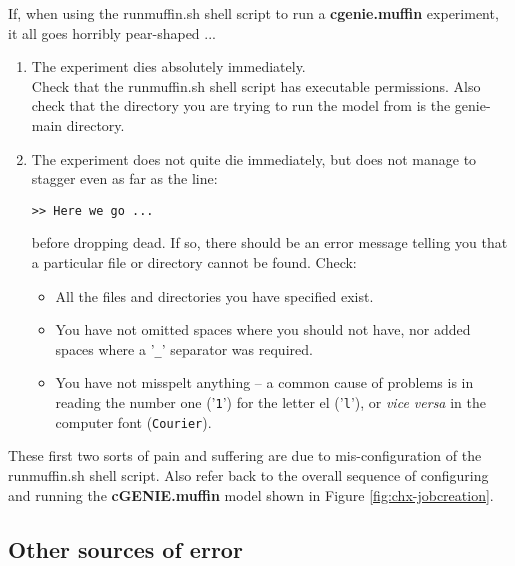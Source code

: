 \documentclass[11pt,fleqn]{book} %
\begin{document}
If, when using the \textsf{\footnotesize runmuffin.sh} shell script to run a \textbf{cgenie.muffin} experiment, it all goes horribly pear-shaped ...
\vspace{1mm}
\begin{enumerate}

\vspace{1mm}
\item The experiment dies absolutely immediately.
\\Check that the \textsf{\footnotesize runmuffin.sh} shell script has executable permissions. Also check that the directory you are trying to run the model from is the \textsf{\footnotesize genie-main} directory.

\item The experiment does not quite die immediately, but does not manage to stagger even as far as the line:
\vspace{-4pt}\begin{verbatim}
>> Here we go ...
\end{verbatim}\vspace{-4pt}
before dropping dead. If so, there should be an error message telling you that a particular file or directory cannot be found. Check:

\begin{itemize}
\item All the files and directories you have specified exist.
\item You have not omitted spaces where you should not have, nor added spaces where a '\texttt{\_}' separator was required.
\item You have not misspelt anything -- a common cause of problems is in reading the number one ('\texttt{1}') for the letter el ('\texttt{l}'), or \textit{vice versa} in the computer font (\texttt{Courier}).
\end{itemize}

\end{enumerate}
\vspace{2mm}

\noindent These first two sorts of pain and suffering are due to mis-configuration of the \textsf{\footnotesize runmuffin.sh} shell script. Also refer back to the overall sequence of configuring and running the \textbf{cGENIE.muffin} model shown in Figure \ref{fig:chx-jobcreation}.


\subsection{Other sources of error}
\end{document}
